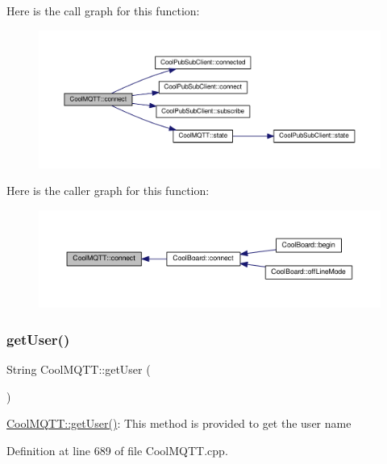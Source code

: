 Here is the call graph for this function\+:\nopagebreak
\begin{figure}[H]
\begin{center}
\leavevmode
\includegraphics[width=350pt]{d0/dd0/class_cool_m_q_t_t_a50075d0ab23a327ab897fd6adad20eda_cgraph}
\end{center}
\end{figure}
Here is the caller graph for this function\+:\nopagebreak
\begin{figure}[H]
\begin{center}
\leavevmode
\includegraphics[width=350pt]{d0/dd0/class_cool_m_q_t_t_a50075d0ab23a327ab897fd6adad20eda_icgraph}
\end{center}
\end{figure}
\mbox{\label{class_cool_m_q_t_t_a373cc92fca7760d886f02d8a6e5b3f63}} 
\subsubsection{\texorpdfstring{get\+User()}{getUser()}}
{\footnotesize\ttfamily String Cool\+M\+Q\+T\+T\+::get\+User (\begin{DoxyParamCaption}{ }\end{DoxyParamCaption})}

\hyperlink{class_cool_m_q_t_t_a373cc92fca7760d886f02d8a6e5b3f63}{Cool\+M\+Q\+T\+T\+::get\+User()}\+: This method is provided to get the user name 

Definition at line 689 of file Cool\+M\+Q\+T\+T.\+cpp.


